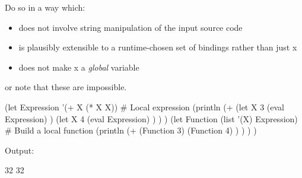 Do so in a way which:

\begin{itemize}
\item
  does not involve string manipulation of the input source code
\item
  is plausibly extensible to a runtime-chosen set of bindings rather
  than just x
\item
  does not make x a \emph{global} variable
\end{itemize}

or note that these are impossible.


\begin{wideverbatim}

(let Expression '(+ X (* X X))            # Local expression
   (println
      (+
         (let X 3
            (eval Expression) )
         (let X 4
            (eval Expression) ) ) )
   (let Function (list '(X) Expression)   # Build a local function
      (println
         (+
            (Function 3)
            (Function 4) ) ) ) )

Output:

32
32

\end{wideverbatim}



% 
